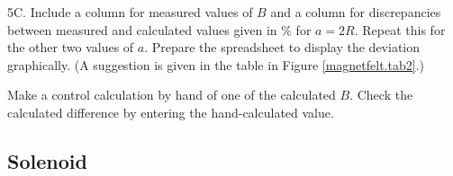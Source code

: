 \documentclass[../Elmag-labhefte-2020.tex]{subfiles}
\begin{document}
{\itsf 5C. Include a column for measured values   of $B$ and a column for discrepancies between measured and calculated values   given in \si{\percent} for $a = 2R$. Repeat this for the other two values   of $a$. Prepare the spreadsheet to display the deviation graphically.} (A suggestion is given in the table in Figure \ref{magnetfelt.tab2}.)

Make a control calculation by hand of one of the calculated $B$. Check the calculated difference by entering the hand-calculated value.

\subsection{Solenoid \label{ch.magnetfelt.solenoide}}
\end{document}
